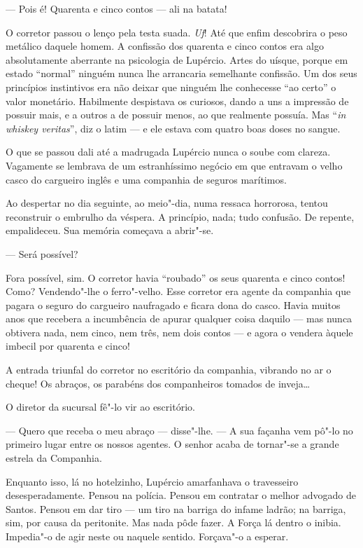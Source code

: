 --- Pois é! Quarenta e cinco contos --- ali na batata!

O corretor passou o lenço pela testa suada. \emph{Uf}! Até que enfim
descobrira o peso metálico daquele homem. A confissão dos quarenta e
cinco contos era algo absolutamente aberrante na psicologia de Lupércio.
Artes do uísque, porque em estado ``normal'' ninguém nunca lhe
arrancaria semelhante confissão. Um dos seus princípios instintivos era
não deixar que ninguém lhe conhecesse ``ao certo'' o valor monetário.
Habilmente despistava os curiosos, dando a uns a impressão de possuir
mais, e a outros a de possuir menos, ao que realmente possuía. Mas
``\emph{in whiskey veritas}'', diz o latim --- e ele estava com quatro
boas doses no sangue.

O que se passou dali até a madrugada Lupércio nunca o soube com clareza.
Vagamente se lembrava de um estranhíssimo negócio em que entravam o
velho
casco do cargueiro inglês e uma companhia de seguros marítimos.

Ao despertar no dia seguinte, ao meio"-dia, numa ressaca horrorosa,
tentou reconstruir o embrulho da véspera. A princípio, nada; tudo
confusão. De repente, empalideceu. Sua memória começava a abrir"-se.

--- Será possível?

Fora possível, sim. O corretor havia ``roubado'' os seus quarenta e
cinco contos! Como? Vendendo"-lhe o ferro"-velho. Esse corretor era agente
da companhia que pagara o seguro do cargueiro naufragado e ficara dona
do casco. Havia muitos anos que recebera a incumbência de apurar
qualquer coisa daquilo --- mas nunca obtivera nada, nem cinco, nem três,
nem dois contos --- e agora o vendera àquele imbecil por quarenta e
cinco!

A entrada triunfal do corretor no escritório da companhia, vibrando no
ar o cheque! Os abraços, os parabéns dos companheiros tomados de
inveja\ldots{}

O diretor da sucursal fê"-lo vir ao escritório.

--- Quero que receba o meu abraço --- disse"-lhe. --- A sua façanha vem
pô"-lo no primeiro lugar entre os nossos agentes. O senhor acaba de
tornar"-se a grande estrela da Companhia.

Enquanto isso, lá no hotelzinho, Lupércio amarfanhava o travesseiro
desesperadamente. Pensou na polícia. Pensou em contratar o melhor
advogado de Santos. Pensou em dar tiro --- um tiro na barriga do infame
ladrão; na barriga, sim, por causa da peritonite. Mas nada pôde fazer. A
Força lá dentro o inibia. Impedia"-o de agir neste ou naquele sentido.
Forçava"-o a esperar.

